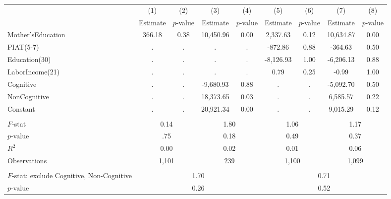 \begin{tabular}{lcccccccc} \toprule
 & (1) & (2) & (3) & (4) & (5) & (6) & (7) & (8) \\
 & Estimate & $p$-value & Estimate & $p$-value  & Estimate & $p$-value  & Estimate & $p$-value  \\ \midrule 
Mother'sEducation  &       366.18 &         0.38 &    10,450.96 &         0.00 &     2,337.63 &         0.12 &    10,634.87 &         0.00 \\  
PIAT(5-7) &            . &            . &            . &            . &      -872.86 &         0.88 &      -364.63 &         0.50 \\  
Education(30) &            . &            . &            . &            . &    -8,126.93 &         1.00 &    -6,206.13 &         0.88 \\  
LaborIncome(21) &            . &            . &            . &            . &         0.79 &         0.25 &        -0.99 &         1.00 \\  
Cognitive&            . &            . &    -9,680.93 &         0.88 &            . &            . &    -5,092.70 &         0.50 \\  
NonCognitive &            . &            . &    18,373.65 &         0.03 &            . &            . &     6,585.57 &         0.22 \\  
Constant&            . &            . &    20,921.34 &         0.00 &            . &            . &     9,015.29 &         0.12 \\   \\ \midrule
$F$-stat &         \multicolumn{2}{c}{0.14} &               \multicolumn{2}{c}{1.80} &                \multicolumn{2}{c}{1.06} &             \multicolumn{2}{c}{1.17}   \\  
$p$-value &         \multicolumn{2}{c}{.75} &               \multicolumn{2}{c}{0.18} &                \multicolumn{2}{c}{0.49} &             \multicolumn{2}{c}{0.37}   \\  
$R^2$ &         \multicolumn{2}{c}{0.00} &               \multicolumn{2}{c}{0.02} &                \multicolumn{2}{c}{0.01} &             \multicolumn{2}{c}{0.06}   \\  
Observations &       \multicolumn{2}{c}{1,101} &              \multicolumn{2}{c}{239}  &       \multicolumn{2}{c}{1,100} &      \multicolumn{2}{c}{1,099}   \\  \\ \midrule
$F$-stat: exclude Cognitive, Non-Cognitive &                \multicolumn{4}{c}{1.70} &                 \multicolumn{4}{c}{0.71}   \\  
$p$-value  &                \multicolumn{4}{c}{0.26} &                \multicolumn{4}{c}{0.52}    \\  \bottomrule \end{tabular}

